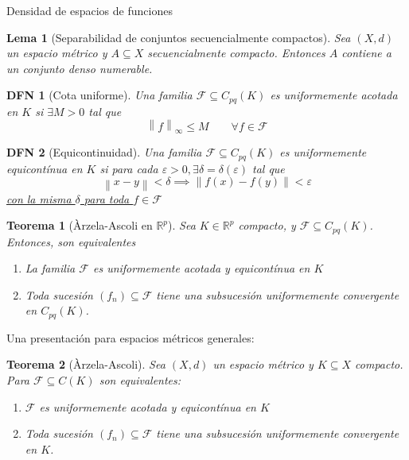 \documentclass[a4paper]{article}\usepackage{/home/alonso/Documents/Projects/formularios/styles}
\newtheorem{definition}{DFN}
\theoremstyle{mytheoremstyle}
\newtheorem{theorem}{Teorema}
\newtheorem{lemma}{Lema}
\newcommand{\R}{\mathbb{R}}
\newcommand{\1}{\mathds{1}}
\newcommand{\norm}[1]{\left\|#1\right\|}
\begin{document}
\begin{multicols*}{3}
\begin{roundbox}{Densidad de espacios de funciones}
\begin{lemma}[Separabilidad de conjuntos secuencialmente compactos]
    Sea $(X,d)$ un espacio métrico y $A \subseteq X$ secuencialmente compacto.
    Entonces $A$ contiene a un conjunto denso numerable.
\end{lemma}

\begin{definition}[Cota uniforme]
    Una familia $\mathcal{F} \subseteq C_{pq}(K)$ es uniformemente acotada en $K$ si $\exists M > 0$ tal que
    \[
        \norm{f}_{\infty} \leq M \qquad \forall f \in \mathcal{F}
    \]
\end{definition}

\begin{definition}[Equicontinuidad]
    Una familia $\mathcal{F} \subseteq C_{pq}(K)$ es uniformemente equicontínua en $K$ si para cada $\varepsilon > 0, \exists \delta = \delta(\varepsilon)$ tal que
    \[
        \norm{x-y} < \delta \implies \norm{f(x) - f(y)} < \varepsilon
    \]
    \underline{con la misma $\delta$ para toda $f \in \mathcal{F}$}
\end{definition}

\begin{theorem}[\`Arzela-Ascoli en $\R^{p}$]
    Sea $K \in \R^{p}$ compacto, y $\mathcal{F} \subseteq C_{pq}(K)$.
    Entonces, son equivalentes
    \begin{enumerate}
        \item La familia $\mathcal{F}$ es uniformemente acotada y equicontínua en $K$
        \item Toda sucesión $(f_n) \subseteq \mathcal{F}$ tiene una subsucesión uniformemente convergente en $C_{pq}(K)$.
    \end{enumerate}
\end{theorem}

Una presentación para espacios métricos generales:

\begin{theorem}[\`Arzela-Ascoli]
    Sea $(X,d)$ un espacio métrico y $K \subseteq X$ compacto.
    Para $\mathcal{F} \subseteq C(K)$ son equivalentes:
    \begin{enumerate}
        \item $\mathcal{F}$ es uniformemente acotada y equicontínua en $K$
        \item Toda sucesión $(f_n) \subseteq \mathcal{F}$ tiene una subsucesión uniformemente convergente en $K$.
    \end{enumerate}
\end{theorem}


\end{roundbox}
\end{multicols*}
\end{document}
